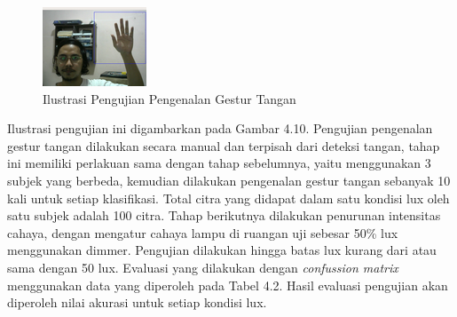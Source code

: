 \begin{figure}[H]
	\centering
	\includegraphics[width=0.5\linewidth]{recoghand}
	\caption{Ilustrasi Pengujian Pengenalan Gestur Tangan}
	\label{fig:recoghand}
\end{figure}
Ilustrasi pengujian ini digambarkan pada Gambar 4.10. Pengujian pengenalan gestur tangan dilakukan secara manual dan terpisah dari deteksi tangan, tahap ini memiliki perlakuan sama dengan tahap sebelumnya, yaitu menggunakan 3 subjek yang berbeda, kemudian dilakukan pengenalan gestur tangan sebanyak 10 kali untuk setiap klasifikasi. Total citra yang didapat dalam satu kondisi lux oleh satu subjek adalah 100 citra.
Tahap berikutnya dilakukan penurunan intensitas cahaya, dengan mengatur cahaya lampu di ruangan uji sebesar 50\% lux menggunakan dimmer. Pengujian dilakukan hingga batas lux kurang dari atau sama dengan 50 lux. Evaluasi yang dilakukan dengan \emph{confussion matrix} menggunakan data yang diperoleh pada Tabel 4.2. Hasil evaluasi pengujian akan diperoleh nilai akurasi untuk setiap kondisi lux. 
